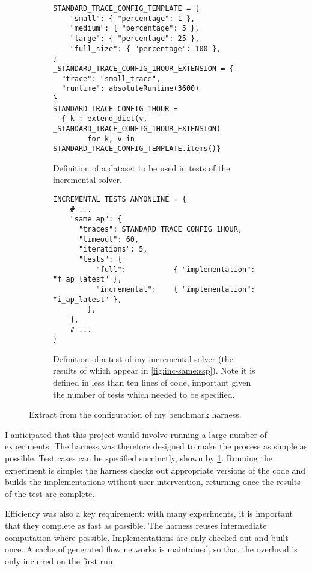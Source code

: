 \begin{figure}
\begin{subfigure}[c]{\textwidth}
\begin{lstlisting}
STANDARD_TRACE_CONFIG_TEMPLATE = {
    "small": { "percentage": 1 },
    "medium": { "percentage": 5 },
    "large": { "percentage": 25 },                        
    "full_size": { "percentage": 100 },
}
_STANDARD_TRACE_CONFIG_1HOUR_EXTENSION = {
  "trace": "small_trace", 
  "runtime": absoluteRuntime(3600)
}
STANDARD_TRACE_CONFIG_1HOUR = 
  { k : extend_dict(v, _STANDARD_TRACE_CONFIG_1HOUR_EXTENSION) 
        for k, v in STANDARD_TRACE_CONFIG_TEMPLATE.items()}        
\end{lstlisting}
\caption{Definition of a dataset to be used in tests of the incremental solver.}
\end{subfigure}
\begin{subfigure}[c]{\textwidth}
\begin{lstlisting}
INCREMENTAL_TESTS_ANYONLINE = {
    # ...
    "same_ap": {
      "traces": STANDARD_TRACE_CONFIG_1HOUR,
      "timeout": 60, 
      "iterations": 5,
      "tests": {
          "full":           { "implementation": "f_ap_latest" },
          "incremental":    { "implementation": "i_ap_latest" },
        },
    },
    # ...
}
\end{lstlisting}
\caption{Definition of a test of my incremental solver (the results of which appear in \cref{fig:inc-same:ssp}). Note it is defined in less than ten lines of code, important given the number of tests which needed to be specified.} 
\end{subfigure}
\caption[Benchmark harness configuration extract]{Extract from the configuration of my benchmark harness.}
\label{fig:benchmark-harness-config-extract}
\end{figure}

I anticipated that this project would involve running a large number of experiments. The harness was therefore designed to make the process as simple as possible. Test cases can be specified succinctly, shown by \cref{fig:benchmark-harness-config-extract}. Running the experiment is simple: the harness checks out appropriate versions of the code and builds the implementations without user intervention, returning once the results of the test are complete.

Efficiency was also a key requirement: with many experiments, it is important that they complete as fast as possible. The harness reuses intermediate computation where possible. Implementations are only checked out and built once. A cache of generated flow networks is maintained, so that the overhead is only incurred on the first run.

